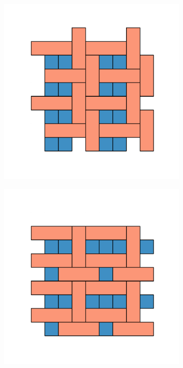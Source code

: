 \begin{figure}[bt]
\begin{subfigure}[b]{0.16\textwidth}
         \caption{}
         \label{fig:pro3pksq6}
     \end{subfigure}
     \hfill
     \begin{subfigure}[b]{0.16\textwidth}
         \centering
         \includegraphics[width=\textwidth]{./figures/procrystals/t0.pdf}
         \caption{}
         \label{fig:pro3pksq7}
     \end{subfigure}
     \hfill
       	 \begin{subfigure}[b]{0.16\textwidth}
         \centering
         \includegraphics[width=\textwidth]{./figures/procrystals/t1.pdf}

\end{subfigure}
\end{figure}
